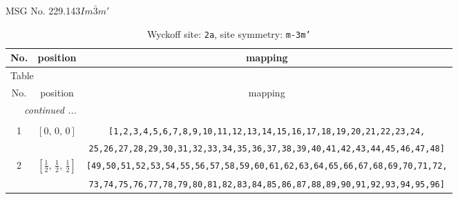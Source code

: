 \documentclass[fleqn,8pt]{jsarticle}
\begin{document}
\setcounter{MaxMatrixCols}{32}

\renewcommand{\tablename}{Table~}
\renewcommand{\figurename}{Figure~}
\begin{center}
\LARGE
MSG No. 229.143\quad$Im\bar{3}m'$
\end{center}
\renewcommand{\arraystretch}{1.2}
\begin{longtable}{ccc}
\caption{Wyckoff site: {\tt 2a}, site symmetry: {\tt m-3m'}}
 \\
 \hline \hline
No. & position & mapping \\ \hline \endfirsthead

\multicolumn{2}{l}{\tablename\ \thetable{}} \\
 \hline \hline
No. & position & mapping \\ \hline \endhead

 \hline \hline
\multicolumn{2}{r}{\footnotesize\it continued ...} \\ \endfoot

 \hline \hline
\multicolumn{2}{r}{} \\ \endlastfoot

1 & $\left[ 0,\, 0,\, 0 \right]$ & {\tt [1,2,3,4,5,6,7,8,9,10,11,12,13,14,15,16,17,18,19,20,21,22,23,24,} \\ \hline
 &  & {\tt 25,26,27,28,29,30,31,32,33,34,35,36,37,38,39,40,41,42,43,44,45,46,47,48]} \\ \hline
2 & $\left[ \frac{1}{2},\, \frac{1}{2},\, \frac{1}{2} \right]$ & {\tt [49,50,51,52,53,54,55,56,57,58,59,60,61,62,63,64,65,66,67,68,69,70,71,72,} \\ \hline
 &  & {\tt 73,74,75,76,77,78,79,80,81,82,83,84,85,86,87,88,89,90,91,92,93,94,95,96]} \\
\end{longtable}
\renewcommand{\arraystretch}{1.2}
\end{document}
